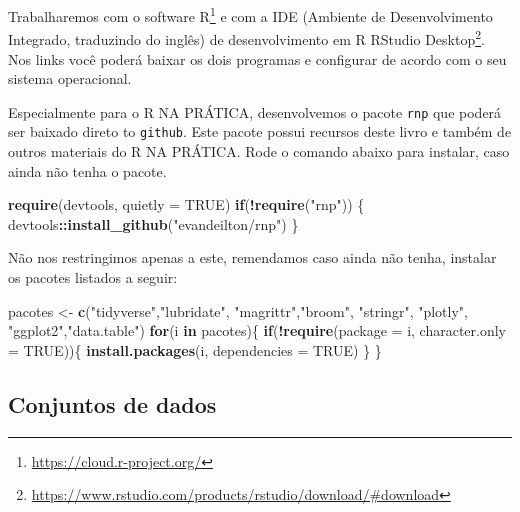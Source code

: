\documentclass[12pt,]{style/krantz}
\makeatletter
\newenvironment{Shaded}{\begin{snugshade}}{\end{snugshade}}
\newcommand{\KeywordTok}[1]{\textcolor[rgb]{0.13,0.29,0.53}{\textbf{#1}}}
\newcommand{\DataTypeTok}[1]{\textcolor[rgb]{0.13,0.29,0.53}{#1}}
\newcommand{\StringTok}[1]{\textcolor[rgb]{0.31,0.60,0.02}{#1}}
\newcommand{\OtherTok}[1]{\textcolor[rgb]{0.56,0.35,0.01}{#1}}
\newcommand{\ControlFlowTok}[1]{\textcolor[rgb]{0.13,0.29,0.53}{\textbf{#1}}}
\newcommand{\OperatorTok}[1]{\textcolor[rgb]{0.81,0.36,0.00}{\textbf{#1}}}
\newcommand{\NormalTok}[1]{#1}
\renewcommand{\href}[2]{#2\footnote{\url{#1}}}
\newenvironment{kframe}{%
\medskip{}
\setlength{\fboxsep}{.8em}
 \def\at@end@of@kframe{}%
 \ifinner\ifhmode%
  \def\at@end@of@kframe{\end{minipage}}%
  \begin{minipage}{\columnwidth}%
 \fi\fi%
 \def\FrameCommand##1{\hskip\@totalleftmargin \hskip-\fboxsep
 \colorbox{shadecolor}{##1}\hskip-\fboxsep
     \hskip-\linewidth \hskip-\@totalleftmargin \hskip\columnwidth}%
 \MakeFramed {\advance\hsize-\width
   \@totalleftmargin\z@ \linewidth\hsize
   \@setminipage}}%
 {\par\unskip\endMakeFramed%
 \at@end@of@kframe}
\renewenvironment{Shaded}{\begin{kframe}}{\end{kframe}}
\theoremstyle{definition}
\theoremstyle{definition}
\theoremstyle{definition}
\theoremstyle{remark}
\makeatother
\begin{document}
Trabalharemos com o \href{https://cloud.r-project.org/}{software R} e
com a IDE (Ambiente de Desenvolvimento Integrado, traduzindo do inglês)
de desenvolvimento em R
\href{https://www.rstudio.com/products/rstudio/download/\#download}{RStudio
Desktop}. Nos links você poderá baixar os dois programas e configurar de
acordo com o seu sistema operacional.

Especialmente para o R NA PRÁTICA, desenvolvemos o pacote \texttt{rnp}
que poderá ser baixado direto to \texttt{github}. Este pacote possui
recursos deste livro e também de outros materiais do R NA PRÁTICA. Rode
o comando abaixo para instalar, caso ainda não tenha o pacote.

\begin{Shaded}
\begin{Highlighting}[]
\KeywordTok{require}\NormalTok{(devtools, }\DataTypeTok{quietly =} \OtherTok{TRUE}\NormalTok{)}
\ControlFlowTok{if}\NormalTok{(}\OperatorTok{!}\KeywordTok{require}\NormalTok{(}\StringTok{"rnp"}\NormalTok{)) \{}
\NormalTok{ devtools}\OperatorTok{::}\KeywordTok{install_github}\NormalTok{(}\StringTok{"evandeilton/rnp"}\NormalTok{) }
\NormalTok{\}}
\end{Highlighting}
\end{Shaded}

Não nos restringimos apenas a este, remendamos caso ainda não tenha,
instalar os pacotes listados a seguir:

\begin{Shaded}
\begin{Highlighting}[]
\NormalTok{pacotes <-}\StringTok{ }\KeywordTok{c}\NormalTok{(}\StringTok{"tidyverse"}\NormalTok{,}\StringTok{"lubridate"}\NormalTok{, }\StringTok{"magrittr"}\NormalTok{,}\StringTok{"broom"}\NormalTok{,}
             \StringTok{"stringr"}\NormalTok{, }\StringTok{"plotly"}\NormalTok{, }\StringTok{"ggplot2"}\NormalTok{,}\StringTok{"data.table"}\NormalTok{)}
\ControlFlowTok{for}\NormalTok{(i }\ControlFlowTok{in}\NormalTok{ pacotes)\{}
  \ControlFlowTok{if}\NormalTok{(}\OperatorTok{!}\KeywordTok{require}\NormalTok{(}\DataTypeTok{package =}\NormalTok{ i, }\DataTypeTok{character.only =} \OtherTok{TRUE}\NormalTok{))\{}
    \KeywordTok{install.packages}\NormalTok{(i, }\DataTypeTok{dependencies =} \OtherTok{TRUE}\NormalTok{)}
\NormalTok{  \}}
\NormalTok{\}}
\end{Highlighting}
\end{Shaded}

\subsection*{Conjuntos de dados}\label{conjuntos-de-dados}
\end{document}
